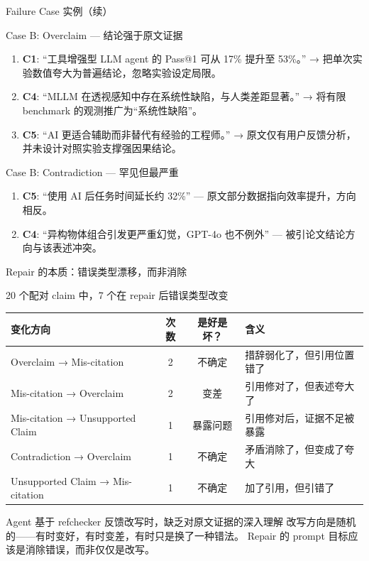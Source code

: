 \documentclass[UTF8,fontset=fandol,aspectratio=169]{ctexbeamer}
\begin{document}
\begin{frame}{Failure Case 实例（续）}
  \begin{block}{Case B: Overclaim — 结论强于原文证据}
    \begin{enumerate}
      \setlength{\itemsep}{2pt}
      \item \textbf{C1}: “工具增强型 LLM agent 的 Pass@1 可从 17\% 提升至 53\%。” → 把单次实验数值夸大为普遍结论，忽略实验设定局限。
      \item \textbf{C4}: “MLLM 在透视感知中存在系统性缺陷，与人类差距显著。” → 将有限 benchmark 的观测推广为“系统性缺陷”。
      \item \textbf{C5}: “AI 更适合辅助而非替代有经验的工程师。” → 原文仅有用户反馈分析，并未设计对照实验支撑强因果结论。
    \end{enumerate}
  \end{block}

  \vspace{0.1em}
  \begin{alertblock}{Case B: Contradiction — 罕见但最严重}
    \begin{enumerate}
      \setlength{\itemsep}{1pt}
      \item \textbf{C5}: “使用 AI 后任务时间延长约 32\%” — 原文部分数据指向效率提升，方向相反。
      \item \textbf{C4}: “异构物体组合引发更严重幻觉，GPT-4o 也不例外” — 被引论文结论方向与该表述冲突。
    \end{enumerate}
  \end{alertblock}
\end{frame}

\begin{frame}{Repair 的本质：错误类型漂移，而非消除}
  \begin{block}{20 个配对 claim 中，7 个在 repair 后错误类型改变}
    \begin{tabularx}{\textwidth}{@{}lccX@{}}
      \toprule
      变化方向 & 次数 & 是好是坏？ & 含义 \\
      \midrule
      Overclaim → Mis-citation & 2 & 不确定 & 措辞弱化了，但引用位置错了 \\
      Mis-citation → Overclaim & 2 & 变差 & 引用修对了，但表述夸大了 \\
      Mis-citation → Unsupported Claim & 1 & 暴露问题 & 引用修对后，证据不足被暴露 \\
      Contradiction → Overclaim & 1 & 不确定 & 矛盾消除了，但变成了夸大 \\
      Unsupported Claim → Mis-citation & 1 & 不确定 & 加了引用，但引错了 \\
      \bottomrule
    \end{tabularx}
  \end{block}

  \vspace{0.3em}
  \begin{alertblock}{Agent 基于 refchecker 反馈改写时，缺乏对原文证据的深入理解}
    改写方向是\alert{随机的}——有时变好，有时变差，有时只是换了一种错法。
    Repair 的 prompt 目标应该是\alert{消除错误}，而非仅仅是改写。
  \end{alertblock}
\end{frame}
\end{document}
